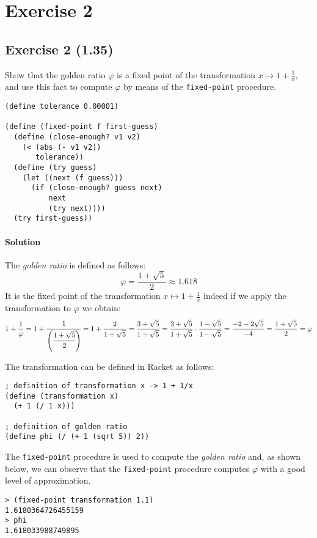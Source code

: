 \section*{Exercise 2}

\subsection*{Exercise 2 (1.35)}
Show that the golden ratio $ \varphi $ is a fixed point of the transformation $ x \mapsto 1 + \frac{1}{x} $, and use this fact
to compute $ \varphi $ by means of the \texttt{fixed-point} procedure.

\begin{lstlisting}
(define tolerance 0.00001)

(define (fixed-point f first-guess)
  (define (close-enough? v1 v2)
    (< (abs (- v1 v2))
       tolerance))
  (define (try guess)
    (let ((next (f guess)))
      (if (close-enough? guess next)
          next
          (try next))))
  (try first-guess))
\end{lstlisting}

\paragraph{Solution}
The \textit{golden ratio} is defined as follows: \[ \varphi = \frac{1 + \sqrt{5}}{2} \approx 1.618 \]
It is the fixed point of the transformation $ x \mapsto 1 + \frac{1}{x} $ indeed if we apply the transformation to $ \varphi $
we obtain:
\[ 
    1 + \frac{1}{\varphi} = 1 + \cfrac{1}{\left( \cfrac{1 + \sqrt{5}}{2} \right) } = 1 + \frac{2}{1 + \sqrt{5}} = 
    \frac{3 + \sqrt{5}}{1 + \sqrt{5}} = \frac{3 + \sqrt{5}}{1 + \sqrt{5}} \cdot \frac{1 - \sqrt{5}}{1 - \sqrt{5}} = 
    \frac{-2 - 2\sqrt{5}}{-4} = \frac{1 + \sqrt{5}}{2} = \varphi
\]

\clearpage
\noindent The transformation can be defined in Racket as follows:
\begin{lstlisting}
; definition of transformation x -> 1 + 1/x
(define (transformation x)
  (+ 1 (/ 1 x)))

; definition of golden ratio
(define phi (/ (+ 1 (sqrt 5)) 2))
\end{lstlisting}
The \texttt{fixed-point} procedure is used to compute the \textit{golden ratio} and, as shown below, we can observe that the
\texttt{fixed-point} procedure computes $ \varphi $ with a good level of approximation.
\begin{lstlisting}[caption={Racket console which shows the result of the \texttt{fixed-point} procedure and the value of $\varphi$}, 
  captionpos=b]
> (fixed-point transformation 1.1)
1.6180364726455159
> phi
1.618033988749895
\end{lstlisting}

